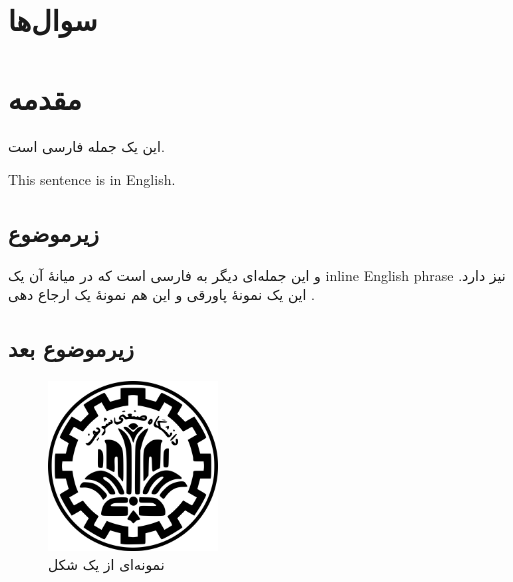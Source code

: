 \documentclass[12pt]{article}
\begin{document}
	\section{سوال‌ها}
	
	\section{مقدمه}
	
	این یک جمله فارسی است.
	
	\begin{english}
		This sentence is in English.
	\end{english}
	
	\subsection{زیرموضوع}
	
	و این جمله‌ای دیگر به فارسی است که در میانهٔ آن یک \textenglish{inline English phrase} نیز دارد.  
	این یک نمونهٔ پاورقی و این هم نمونهٔ یک ارجاع دهی
	\cite{kurose2017}.
	\subsection{زیرموضوع بعد}
	
	\begin{figure}[h]
		\centering
		\includegraphics[width=0.4\textwidth]{sharif.png}
		\caption{نمونه‌ای از یک شکل}
	\end{figure}
	
	\newpage
	\begin{LTR}
		\printbibliography[title={مراجع}]
	\end{LTR}

	
\end{document}
